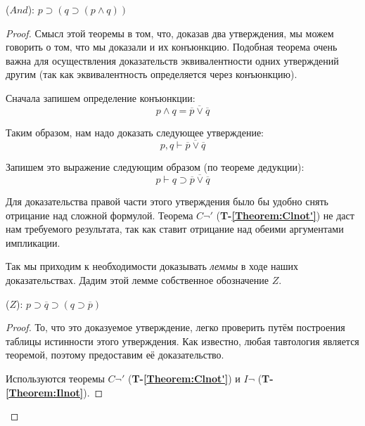 \begin{propthm}\label{Theorem:And}
    ($And$): $p \supset (q \supset (p \land q))$
\end{propthm}
\begin{proof}
    Смысл этой теоремы в том, что, доказав два утверждения, мы можем говорить о том, что мы доказали и их конъюнкцию. Подобная теорема очень важна для осуществления доказательств эквивалентности одних утверждений другим (так как эквивалентность определяется через конъюнкцию).

    Сначала запишем определение конъюнкции:
    \begin{equation*}
        p \land q = \overline{\overline{p} \lor \overline{q}}
    \end{equation*}

    Таким образом, нам надо доказать следующее утверждение:
    \begin{equation*}
        p, q \vdash \overline{\overline{p} \lor \overline{q}}
    \end{equation*}

    Запишем это выражение следующим образом (по теореме дедукции):
    \begin{equation*}\label{what}
        p \vdash q \supset \overline{\overline{p} \lor \overline{q}} \tag{$\ast$}
    \end{equation*}
    
    Для доказательства правой части этого утверждения было бы удобно снять отрицание над сложной формулой. Теорема $C\lnot'$ (\textbf{T-\ref{Theorem:Clnot'}}) не даст нам требуемого результата, так как ставит отрицание над обеими аргументами импликации.

    Так мы приходим к необходимости доказывать \textit{леммы} в ходе наших доказательствах. Дадим этой лемме собственное обозначение $Z$.

    \begin{propthm}\label{Theorem:Z}
        ($Z$): $p \supset \overline{q} \supset (q \supset \overline{p})$
    \end{propthm}
    \begin{proof}
        То, что это доказуемое утверждение, легко проверить путём построения таблицы истинности этого утверждения. Как известно, любая тавтология является теоремой, поэтому предоставим её доказательство.

        Используются теоремы $C\lnot'$ (\textbf{T-\ref{Theorem:Clnot'}}) и $I\lnot$ (\textbf{T-\ref{Theorem:Ilnot}}).


\end{proof}
\end{proof}
